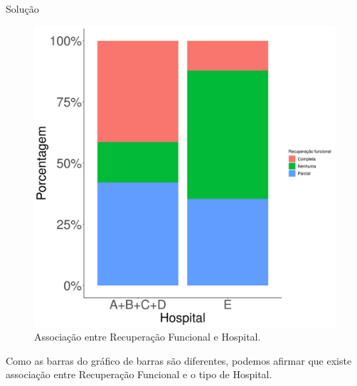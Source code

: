 \documentclass[9pt]{beamer}
\begin{document}
\begin{frame}{Solução}

\begin{figure}[htbp]
	\centering
	\caption{Associação entre Recuperação Funcional e Hospital.}
	\includegraphics[width = 0.6\linewidth]{figures/associacao_moderada.png}
\end{figure}

Como as barras do gráfico de barras são diferentes, podemos afirmar que existe associação entre Recuperação Funcional e o tipo de Hospital.
\end{frame}
\end{document}
